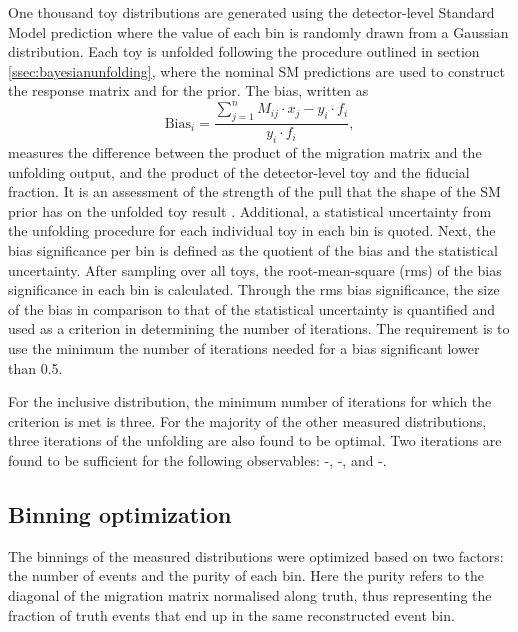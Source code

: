 One thousand toy distributions are generated using the detector-level Standard Model prediction where the value of each bin is randomly drawn from a Gaussian distribution. Each toy is unfolded following the procedure outlined in section \ref{ssec:bayesianunfolding}, where the nominal SM predictions are used to construct the response matrix and for the prior. The bias, written as
\begin{equation} \label{eq:unfbias}
    \text{Bias}_i=\dfrac{\sum_{j=1}^nM_{ij}\cdot x_j-y_i\cdot f_i}{y_i\cdot f_i},
\end{equation}
measures the difference between the product of the migration matrix and the unfolding output, and the product of the detector-level toy and the fiducial fraction. It is an assessment of the strength of the pull that the shape of the SM prior has on the unfolded toy result . Additional, a statistical uncertainty from the unfolding procedure for each individual toy in each bin is quoted. Next, the bias significance per bin is defined as the quotient of the bias and the statistical uncertainty. After sampling over all toys, the root-mean-square (rms) of the bias significance in each bin is calculated. Through the rms bias significance, the size of the bias in comparison to that of the statistical uncertainty is quantified and used as a criterion in determining the number of iterations. The requirement is to use the minimum the number of iterations needed for a bias significant lower than 0.5.

For the inclusive \mFourL{} distribution, the minimum number of iterations for which the criterion is met is three. For the majority of the other measured distributions, three iterations of the unfolding are also found to be optimal. Two iterations are found to be sufficient for the following observables: \mZOne-\mFourL, \dPhill-\mFourL, and \dYPairs-\mFourL.

\subsection{Binning optimization}
\label{subsec:binningopt}

The binnings of the measured distributions were optimized based on two factors: the number of events and the purity of each bin. Here the purity refers to the diagonal of the migration matrix normalised along truth, thus representing the fraction of truth events that end up in the same reconstructed event bin. 

